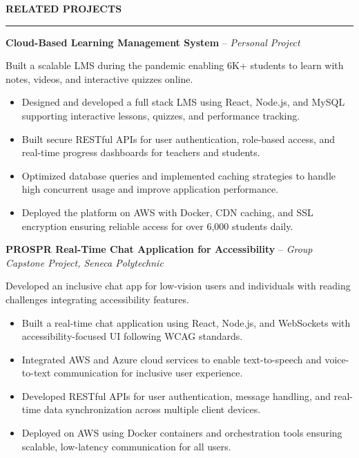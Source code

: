 \documentclass[10pt,letterpaper]{article}
\begin{document}
\vspace{6pt}

\textbf{RELATED PROJECTS}\\[-8pt]
\noindent\rule{\textwidth}{1pt}

\vspace{-2pt}

\textbf{Cloud-Based Learning Management System} -- \emph{Personal Project}

\vspace{-1pt}

Built a scalable LMS during the pandemic enabling 6K+ students to learn with notes, videos, and interactive quizzes online.
\vspace{-1pt}
\begin{itemize}
\item Designed and developed a full stack LMS using React, Node.js, and MySQL supporting interactive lessons, quizzes, and performance tracking.
\item Built secure RESTful APIs for user authentication, role-based access, and real-time progress dashboards for teachers and students.
\item Optimized database queries and implemented caching strategies to handle high concurrent usage and improve application performance.
\item Deployed the platform on AWS with Docker, CDN caching, and SSL encryption ensuring reliable access for over 6,000 students daily.
\end{itemize}

\textbf{PROSPR  Real-Time Chat Application for Accessibility} -- \emph{Group Capstone Project, Seneca Polytechnic}

\vspace{-1pt}

Developed an inclusive chat app for low-vision users and individuals with reading challenges integrating accessibility features.
\vspace{-1pt}
\begin{itemize}
\item Built a real-time chat application using React, Node.js, and WebSockets with accessibility-focused UI following WCAG standards.
\item Integrated AWS and Azure cloud services to enable text-to-speech and voice-to-text communication for inclusive user experience.
\item Developed RESTful APIs for user authentication, message handling, and real-time data synchronization across multiple client devices.
\item Deployed on AWS using Docker containers and orchestration tools ensuring scalable, low-latency communication for all users.
\end{itemize}
\end{document}
